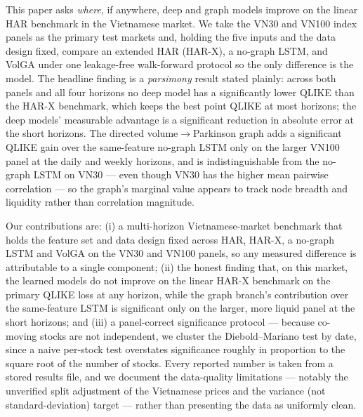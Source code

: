 \documentclass[runningheads]{llncs}
\begin{document}
This paper asks \emph{where}, if anywhere, deep and graph models improve on the linear HAR
benchmark in the Vietnamese market. We take the VN30 and VN100 index panels as the primary test
markets and, holding the five inputs and the data design fixed, compare an extended HAR (HAR-X), a
no-graph LSTM, and VolGA under one leakage-free walk-forward protocol so the only difference is the
model. The headline finding is a \emph{parsimony} result stated plainly: across both panels and all
four horizons no deep model has a significantly lower QLIKE than the HAR-X benchmark, which keeps
the best point QLIKE at most horizons; the deep models' measurable advantage is a significant
reduction in absolute error at the short horizons. The directed volume$\to$Parkinson graph adds a
significant QLIKE gain over the same-feature no-graph LSTM only on the larger VN100 panel at the
daily and weekly horizons, and is indistinguishable from the no-graph LSTM on VN30 --- even though
VN30 has the higher mean pairwise correlation --- so the graph's marginal value appears to track
node breadth and liquidity rather than correlation magnitude.

Our contributions are: (i) a multi-horizon Vietnamese-market benchmark that holds the feature set
and data design fixed across HAR, HAR-X, a no-graph LSTM and VolGA on the VN30 and VN100 panels, so
any measured difference is attributable to a single component; (ii) the honest finding that, on this
market, the learned models do not improve on the linear HAR-X benchmark on the primary QLIKE loss at
any horizon, while the graph branch's contribution over the same-feature LSTM is significant only on
the larger, more liquid panel at the short horizons; and (iii) a panel-correct significance protocol
--- because co-moving stocks are not independent, we cluster the Diebold--Mariano test by date,
since a naive per-stock test overstates significance roughly in proportion to the square root of the
number of stocks. Every reported number is taken from a stored results file, and we document the
data-quality limitations --- notably the unverified split adjustment of the Vietnamese prices and
the variance (not standard-deviation) target --- rather than presenting the data as uniformly clean.
\end{document}
